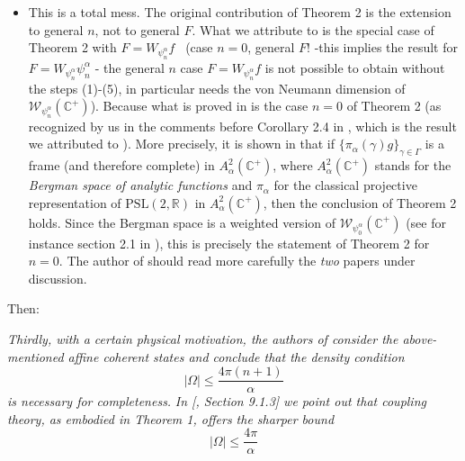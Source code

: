 \documentclass[11pt,reqno]{amsart}
\numberwithin{equation}{section}
\theoremstyle{plain}
\theoremstyle{definition}
\theoremstyle{remark}
\begin{document}
\begin{itemize}
\item This is a total mess. The original contribution of Theorem 2 is the
extension to general $n$, not to general $F$. What we attribute to \cite%
{Jordi} is the special case of Theorem 2 with $F=W_{\psi _{n}^{\alpha }}f$ \
(case $n=0$, general $F$! -this implies the result for $F=W_{\psi
_{n}^{\alpha }}\psi _{n}^{\alpha }$ - the general $n$ case $F=W_{\psi
_{n}^{\alpha }}f$ is not possible to obtain without the steps (1)-(5), in
particular needs the von Neumann dimension of $\mathcal{W}_{\psi
_{n}^{\alpha }}(\mathbb{C}^{+})$). Because what is proved in \cite{Jordi} is
the case $n=0$ of Theorem 2 (as recognized by us in the comments before
Corollary 2.4 in \cite{Affine}, which is the result we attributed to \cite%
{Jordi}). More precisely, it is shown in \cite[Section 9.1.2-9.1.3]{Jordi}
that if $\{\pi _{\alpha }\left( \gamma \right) g\}_{\gamma \in \Gamma }$ is
a frame (and therefore complete) in $A_{\alpha }^{2}\left( \mathbb{C}%
^{+}\right) $, where $A_{\alpha }^{2}\left( \mathbb{C}^{+}\right) $ stands
for the \emph{Bergman space of analytic functions }and $\pi _{\alpha }$ for
the classical projective representation of $\mathrm{PSL}(2,\mathbb{R})$ in $%
A_{\alpha }^{2}\left( \mathbb{C}^{+}\right) $, then the conclusion of
Theorem 2 holds. Since the Bergman space is a weighted version of $\mathcal{W%
}_{\psi _{0}^{\alpha }}(\mathbb{C}^{+})$ (see for instance section 2.1 in 
\cite{Fractal}), this is precisely the statement of Theorem 2 for $n=0$. The
author of \cite{Letter} should read more carefully the \textsl{two} papers
under discussion.%
\begin{equation*}
\end{equation*}
\end{itemize}

Then:

\bigskip

\emph{Thirdly, with a certain physical motivation, the authors of \cite{AoP}
consider the above-mentioned affine coherent states and conclude that the
density condition }%
\begin{equation*}
|\Omega |\leq \frac{4\pi (n+1)}{\alpha }
\end{equation*}%
\emph{is necessary for completeness.} \emph{In [\cite{Jordi}, Section 9.1.3]
we point out that coupling theory, as embodied in Theorem 1, offers the
sharper bound}%
\begin{equation}
|\Omega |\leq \frac{4\pi }{\alpha }  \label{bound}
\end{equation}
\end{document}
